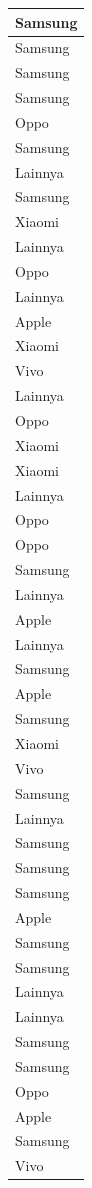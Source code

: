 \documentclass[
  letterpaper,
  DIV=11,
  numbers=noendperiod]{scrartcl}
\begin{document}
\begin{table}
\begin{tabular}[t]{l}
\hline
Samsung\\
\hline
Samsung\\
\hline
Samsung\\
\hline
Samsung\\
\hline
Oppo\\
\hline
Samsung\\
\hline
Lainnya\\
\hline
Samsung\\
\hline
Xiaomi\\
\hline
Lainnya\\
\hline
Oppo\\
\hline
Lainnya\\
\hline
Apple\\
\hline
Xiaomi\\
\hline
Vivo\\
\hline
Lainnya\\
\hline
Oppo\\
\hline
Xiaomi\\
\hline
Xiaomi\\
\hline
Lainnya\\
\hline
Oppo\\
\hline
Oppo\\
\hline
Samsung\\
\hline
Lainnya\\
\hline
Apple\\
\hline
Lainnya\\
\hline
Samsung\\
\hline
Apple\\
\hline
Samsung\\
\hline
Xiaomi\\
\hline
Vivo\\
\hline
Samsung\\
\hline
Lainnya\\
\hline
Samsung\\
\hline
Samsung\\
\hline
Samsung\\
\hline
Apple\\
\hline
Samsung\\
\hline
Samsung\\
\hline
Lainnya\\
\hline
Lainnya\\
\hline
Samsung\\
\hline
Samsung\\
\hline
Oppo\\
\hline
Apple\\
\hline
Samsung\\
\hline
Vivo\\

\end{tabular}
\end{table}
\end{document}
